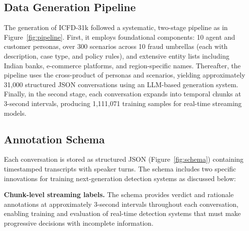 \documentclass{article}
\begin{document}

\subsection{Data Generation Pipeline}

The generation of ICFD-31k followed a systematic, two-stage pipeline as in Figure~\ref{fig:pipeline}. First, it employs foundational components: 10 agent and customer personas, over 300 scenarios across 10 fraud umbrellas (each with description, case type, and policy rules), and extensive entity lists including Indian banks, e-commerce platforms, and region-specific names. Thereafter, the pipeline uses the cross-product of personas and scenarios, yielding approximately 31,000 structured JSON conversations using an LLM-based generation system. Finally, in the second stage, each conversation expands into temporal chunks at 3-second intervals, producing 1,111,071 training samples for real-time streaming models.

\subsection{Annotation Schema}


Each conversation is stored as structured JSON (Figure~\ref{fig:schema}) containing timestamped transcripts with speaker turns. The schema includes two specific innovations for training next-generation detection systems as discussed below:

\textbf{Chunk-level streaming labels.} The schema provides verdict and rationale annotations at approximately 3-second intervals throughout each conversation, enabling training and evaluation of real-time detection systems that must make progressive decisions with incomplete information.
\end{document}
